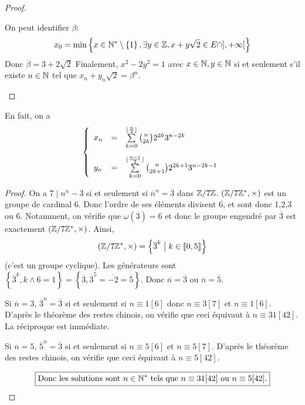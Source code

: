 \begin{proof}
\begin{enumerate}
		On peut identifier $\beta$:
		\begin{equation}
			x_{0}=\min\left\{x\in\mathbb{N}^{*}\setminus\left\{1\right\},\exists y\in\mathbb{Z},x+y\sqrt{2}\in E\cap],+\infty[\right\}
		\end{equation}
		Donc $\beta=3+2\sqrt{2}$ Finalement, $x^{2}-2y^{2}=1$ avec $x\in\mathbb{N},y\in\mathbb{N}$ si et seulement s'il existe $n\in\mathbb{N}$ tel que $x_{n}+y_{n}\sqrt{2}=\beta^{n}$.
	\end{enumerate}
\end{proof}

\begin{remark}
	En fait, on a 
	\begin{equation}
		\left\{
			\begin{array}[]{lcl}
				x_{n} &= &\sum\limits_{k=0}^{\lfloor \frac{n}{2}\rfloor}\binom{n}{2k}2^{2k}3^{n-2k}\\[0.5cm]
				y_{n} &= &\sum\limits_{k=0}^{\lfloor \frac{n-1}{2}\rfloor}\binom{n}{2k+1}2^{2k+1}3^{n-2k-1}
			\end{array}	
		\right.
	\end{equation}
\end{remark}

\begin{proof}
	On a $7\mid n^{n}-3$ si et seulement si $\overline{n}^{n}=\overline{3}$ dans $\mathbb{Z}/7\mathbb{Z}$. $(\mathbb{Z}/7\mathbb{Z}^{*},\times)$ est un groupe de cardinal 6. Donc l'ordre de ses éléments divisent 6, et sont donc 1,2,3 ou 6. Notamment, on vérifie que $\omega(\overline{3})=6$ et donc le groupe engendré par $\overline{3}$ est exactement $(\mathbb{Z}/7\mathbb{Z}^{*},\times)$. Ainsi, 
	\begin{equation}
		(\mathbb{Z}/7\mathbb{Z}^{*},\times)=\left\{\overline{3}^{k}\bigm| k\in\left\llbracket 0,5\right\rrbracket\right\}
	\end{equation}
	(c'est un groupe cyclique). Les générateurs sont $\left\{\overline{3}^{k},k\wedge 6=1\right\}=\left\{\overline{3},\overline{3}^{5}=\overline{-2}=\overline{5}\right\}$.
	Donc $\overline{n}=\overline{3}$ ou $\overline{n}=\overline{5}$.

	Si $\overline{n}=3$, $\overline{3}^{n}=\overline{3}$ si et seulement si $n\equiv1[6]$ donc $n\equiv 3[7]$ et $n\equiv1[6]$. D'après le théorème des restes chinois, on vérifie que ceci équivaut à $n\equiv31[42]$. La réciproque est immédiate.

	Si $\overline{n}=5$, $\overline{5}^{n}=\overline{3}$ si et seulement si $n\equiv5[6]$ et $n\equiv5[7]$. D'après le théorème des restes chinois, on vérifie que ceci équivaut à $n\equiv5[42]$.

	\begin{equation}
		\boxed{\text{Donc les solutions sont }n\in\mathbb{N}^{*}\text{ tels que }n\equiv31[42]\text{ ou }n\equiv5[42].}
	\end{equation}
\end{proof}


